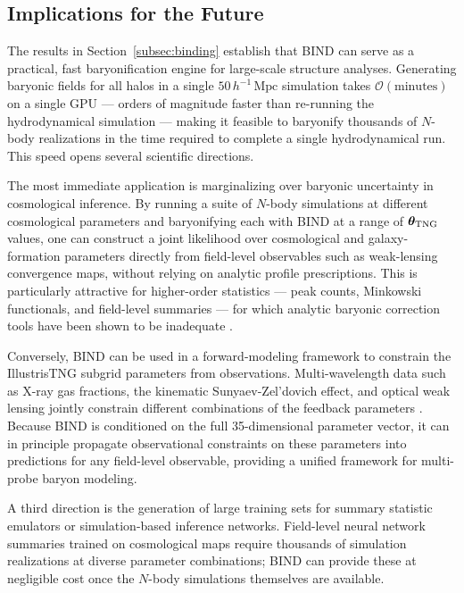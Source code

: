 \documentclass[linenumbers,trackchanges, twocolumn]{aastex701}
\begin{document}
\subsection{Implications for the Future}
\label{subsec:implications}

The results in Section~\ref{subsec:binding} establish that \textsc{BIND} can serve as a practical, fast baryonification engine for large-scale structure analyses. Generating baryonic fields for all halos in a single $50\,h^{-1}\,\mathrm{Mpc}$ simulation takes $\mathcal{O}(\mathrm{minutes})$ on a single GPU --- orders of magnitude faster than re-running the hydrodynamical simulation --- making it feasible to baryonify thousands of $N$-body realizations in the time required to complete a single hydrodynamical run. This speed opens several scientific directions.

The most immediate application is marginalizing over baryonic uncertainty in cosmological inference. By running a suite of $N$-body simulations at different cosmological parameters and baryonifying each with \textsc{BIND} at a range of $\boldsymbol{\theta}_{\rm TNG}$ values, one can construct a joint likelihood over cosmological and galaxy-formation parameters directly from field-level observables such as weak-lensing convergence maps, without relying on analytic profile prescriptions. This is particularly attractive for higher-order statistics --- peak counts, Minkowski functionals, and field-level summaries --- for which analytic baryonic correction tools have been
shown to be inadequate \citep{Lee-2023, Lee-2026a}.

Conversely, \textsc{BIND} can be used in a forward-modeling framework to constrain the IllustrisTNG subgrid parameters from observations. Multi-wavelength data such as X-ray gas fractions, the kinematic Sunyaev-Zel'dovich effect, and optical weak lensing jointly constrain different combinations of the feedback parameters \citep{Kovac-2025}. Because \textsc{BIND} is conditioned on the full 35-dimensional parameter vector, it can in principle propagate observational constraints on these parameters into predictions for any field-level observable, providing a unified framework for multi-probe baryon modeling.

A third direction is the generation of large training sets for summary statistic emulators or simulation-based inference networks. Field-level neural network summaries trained on cosmological maps require thousands of simulation realizations at diverse parameter combinations; \textsc{BIND} can provide these at negligible cost once the $N$-body simulations themselves are available.
\end{document}

